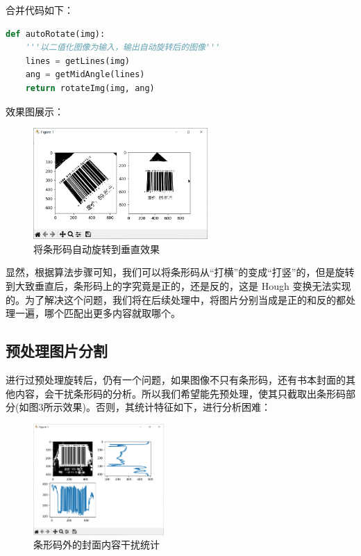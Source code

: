 \documentclass{ctexart}
\begin{document}
合并代码如下：
\begin{lstlisting}[language=python]
def autoRotate(img):
    '''以二值化图像为输入，输出自动旋转后的图像'''
    lines = getLines(img)
    ang = getMidAngle(lines)
    return rotateImg(img, ang)
\end{lstlisting}

效果图展示：
\begin{figure}[H]
    \centering
    \includegraphics[height=120pt]{sample_autoRotate}
    \caption{将条形码自动旋转到垂直效果}
\end{figure}

显然，根据算法步骤可知，我们可以将条形码从“打横”的变成“打竖”的，但是旋转到大致垂直后，条形码上的字究竟是正的，还是反的，这是 Hough 变换无法实现的。为了解决这个问题，我们将在后续处理中，将图片分别当成是正的和反的都处理一遍，哪个匹配出更多内容就取哪个。

\subsection{预处理图片分割}
进行过预处理旋转后，仍有一个问题，如果图像不只有条形码，还有书本封面的其他内容，会干扰条形码的分析。所以我们希望能先预处理，使其只截取出条形码部分(如图3所示效果)。否则，其统计特征如下，进行分析困难：
\begin{figure}[H]
    \centering
    \includegraphics[height=120pt]{isbn_beforeCut}
    \caption{条形码外的封面内容干扰统计}
\end{figure}
\end{document}

